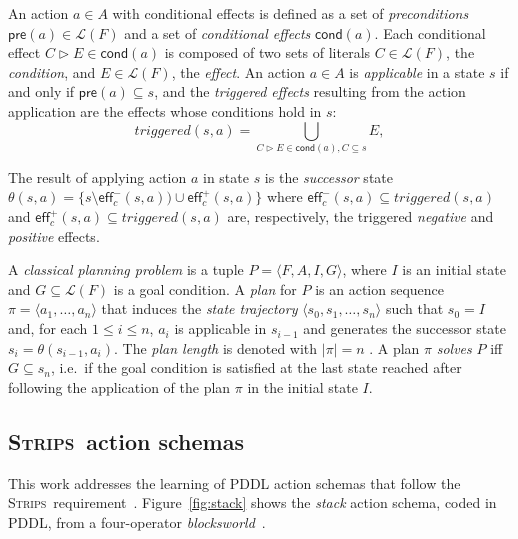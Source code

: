 \documentclass{article}
\newcommand{\tup}[1]{{\langle #1 \rangle}}
\newcommand{\pre}{\mathsf{pre}}     %
\newcommand{\eff}{\mathsf{eff}}     %
\newcommand{\cond}{\mathsf{cond}}   %
\newcommand{\strips}{\textsc{Strips}}     %
\begin{document}


An action $a\in A$ with conditional effects is defined as a set of {\em preconditions} $\pre(a)\in\mathcal{L}(F)$ and a set of {\em conditional effects} $\cond(a)$. Each conditional effect $C\rhd E\in\cond(a)$ is composed of two sets of literals $C\in\mathcal{L}(F)$, the {\em condition}, and $E\in\mathcal{L}(F)$, the {\em effect}. An action $a\in A$ is {\em applicable} in a state $s$ if and only if $\pre(a)\subseteq s$, and the {\em triggered effects} resulting from the action application are the effects whose conditions hold in $s$:
\[
triggered(s,a)=\bigcup_{C\rhd E\in\cond(a),C\subseteq s} E,
\]

The result of applying action $a$ in state $s$ is the {\em successor} state $\theta(s,a)=\{s\setminus\eff_c^-(s,a))\cup\eff_c^+(s,a)\}$ where $\eff_c^-(s,a)\subseteq triggered(s,a)$ and $\eff_c^+(s,a)\subseteq triggered(s,a)$ are, respectively, the triggered {\em negative} and {\em positive} effects.


A {\em classical planning problem} is a tuple $P=\tup{F,A,I,G}$, where $I$ is an initial state and $G\subseteq\mathcal{L}(F)$ is a goal condition. A {\em plan} for $P$ is an action sequence $\pi=\tup{a_1, \ldots, a_n}$ that induces the {\em state trajectory} $\tup{s_0, s_1, \ldots, s_n}$ such that $s_0=I$ and, for each {\small $1\leq i\leq n$}, $a_i$ is applicable in $s_{i-1}$ and generates the successor state $s_i=\theta(s_{i-1},a_i)$. The {\em plan length} is denoted with $|\pi|=n$ . A plan $\pi$ {\em solves} $P$ iff $G\subseteq s_n$, i.e.~if the goal condition is satisfied at the last state reached after following the application of the plan $\pi$ in the initial state $I$.




\subsection{\strips\ action schemas}
This work addresses the learning of PDDL action schemas that follow the \strips\ requirement~\cite{mcdermott1998pddl,fox2003pddl2}. Figure~\ref{fig:stack} shows the {\em stack} action schema, coded in PDDL, from a four-operator {\em blocksworld}~\cite{slaney2001blocks}.
\end{document}
